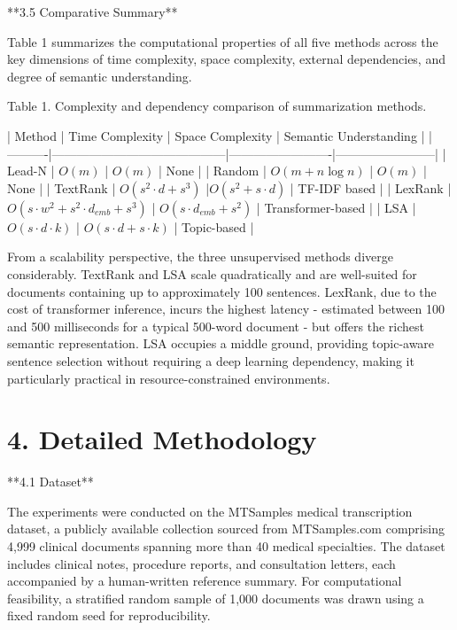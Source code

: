 \documentclass[10pt]{book}
\begin{document}
**3.5 Comparative Summary**

Table 1 summarizes the computational properties of all five methods across the key dimensions of time complexity, space complexity, external dependencies, and degree of semantic understanding.

Table 1. Complexity and dependency comparison of summarization methods.

| Method   | Time Complexity                          | Space Complexity        | Semantic Understanding |
|----------|------------------------------------------|-------------------------|------------------------|
| Lead-N   | $O(m)$ | $O(m)$                    | None                   |
| Random   | $O(m + n \log n)$ | $O(m)$                 | None                   |
| TextRank | $O(s^2 \cdot d + s^3)$   |$O(s^2+ s \cdot d)$     | TF-IDF based           |
| LexRank  | $O(s \cdot w^2 + s^2 \cdot d_{emb} + s^3)$ | $O(s \cdot d_{emb} + s^2)$       | Transformer-based      |
| LSA      | $O(s \cdot d \cdot k)$                            | $O(s \cdot d + s \cdot k)$       | Topic-based            |

From a scalability perspective, the three unsupervised methods diverge considerably. TextRank and LSA scale quadratically and are well-suited for documents containing up to approximately 100 sentences. LexRank, due to the cost of transformer inference, incurs the highest latency - estimated between 100 and 500 milliseconds for a typical 500-word document - but offers the richest semantic representation. LSA occupies a middle ground, providing topic-aware sentence selection without requiring a deep learning dependency, making it particularly practical in resource-constrained environments.


\section{4. Detailed Methodology}

**4.1 Dataset**

The experiments were conducted on the MTSamples medical transcription dataset, a publicly available collection sourced from MTSamples.com comprising 4,999 clinical documents spanning more than 40 medical specialties. The dataset includes clinical notes, procedure reports, and consultation letters, each accompanied by a human-written reference summary. For computational feasibility, a stratified random sample of 1,000 documents was drawn using a fixed random seed for reproducibility.
\end{document}
